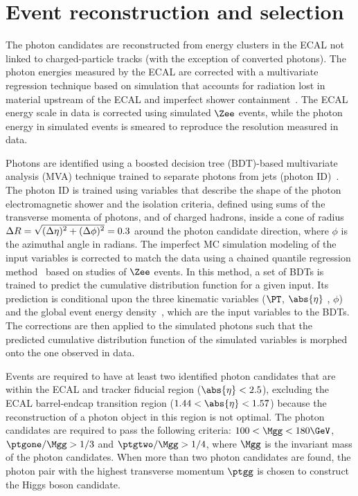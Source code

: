 \documentclass[11pt,a4paper,cmspaper,final,collab]{cms-tdr}
\begin{document}
\section{Event reconstruction and selection}\label{sec:objects}

The photon candidates are reconstructed from energy clusters in the ECAL not linked to charged-particle tracks (with the exception of converted photons). The photon energies measured by the ECAL are corrected with a multivariate regression technique based on simulation that accounts for radiation lost in material upstream of the ECAL and imperfect shower containment~\cite{Sirunyan:2018ouh}. The ECAL energy scale in data is corrected using simulated $\Zee$ events, while the photon energy in simulated events is smeared to reproduce the resolution measured in data. 

Photons are identified using a boosted decision tree (BDT)-based multivariate analysis (MVA) technique trained to separate photons from jets (photon ID)~\cite{Sirunyan:2018ouh}. The photon ID is trained using variables that describe the shape of the photon electromagnetic shower and the isolation criteria, defined using sums of the transverse momenta of photons, and of charged 
hadrons, inside a cone of radius $\Delta R = \sqrt{\smash[b]{(\Delta \eta)^2 +(\Delta \phi)^2}} = 0.3$ around the photon candidate direction, where $\phi$ is the azimuthal angle in radians. The imperfect MC simulation modeling of the input variables is corrected to match the data using a chained quantile regression method~\cite{cqr} based on studies of $\Zee$ events. In this method, a set of BDTs is trained to predict the cumulative distribution function for a given input. Its prediction is conditional upon the three kinematic variables ($\PT$, $\abs{\eta}$ , $\phi$) and the global event energy density~\cite{Sirunyan:2018ouh}, which are the input variables to the BDTs. The corrections are then applied to the simulated photons such that the predicted cumulative distribution function of the simulated variables is morphed onto the one observed in data.

Events are required to have at least two identified photon candidates that are within the ECAL and tracker fiducial region ($\abs{\eta} < 2.5$), excluding the ECAL barrel-endcap transition region ($1.44 < \abs{\eta} < 1.57$) because the reconstruction of a photon object in this region is not optimal. The photon candidates are required to pass the following criteria: $100 < \Mgg < 180 \GeV$, \mbox{$\ptgone/\Mgg > 1/3$} and \mbox{$\ptgtwo/\Mgg > 1/4$}, where $\Mgg$ is the invariant mass of the photon candidates. When more than two photon candidates are found, the photon pair with the highest transverse momentum $\ptgg$ is chosen to construct the Higgs boson candidate.
\end{document}
